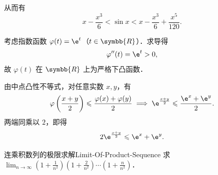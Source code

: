 \begin{myproof}
    从而有
    \begin{equation}
        x - \frac{x^3}{6} < \sin x < x - \frac{x^3}{6} + \frac{x^5}{120}.
    \end{equation}


    考虑指数函数 $\varphi(t) = \e^t$（$t \in \symbb{R}$）．求导得
    \begin{equation}
        \varphi''(t) = \e^t > 0,
    \end{equation}
    故 $\varphi(t)$ 在 $\symbb{R}$ 上为严格下凸函数．

    由中点凸性不等式，对任意实数 $x, y$，有
    \begin{equation}
        \varphi\left( \frac{x + y}{2} \right) \leqslant \frac{\varphi(x) + \varphi(y)}{2} \implies \e^{\frac{x+y}{2}} \leqslant \frac{\e^x + \e^y}{2}.
    \end{equation}
    两端同乘以 $2$，即得
    \begin{equation}
        2\e^{\frac{x+y}{2}} \leqslant \e^x + \e^y.
    \end{equation}
\end{myproof}

\begin{problem}{连乘积数列的极限求解}{Limit-Of-Product-Sequence}
    求 $\lim_{n\to\infty} \left( 1 + \frac{1}{n^2} \right)\left( 1 + \frac{2}{n^2} \right)\cdots\left( 1 + \frac{n}{n^2} \right)$．
\end{problem}


